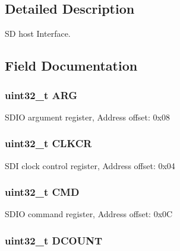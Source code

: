 \subsection{Detailed Description}
S\-D host Interface. 

\subsection{Field Documentation}
\hypertarget{struct_s_d_i_o___type_def_a07d4e63efcbde252c667e64a8d818aa9}{
\subsubsection[{A\-R\-G}]{ uint32\-\_\-t A\-R\-G}}\label{struct_s_d_i_o___type_def_a07d4e63efcbde252c667e64a8d818aa9}
S\-D\-I\-O argument register, Address offset\-: 0x08 \hypertarget{struct_s_d_i_o___type_def_aa94197378e20fc739d269be49d9c5d40}{
\subsubsection[{C\-L\-K\-C\-R}]{ uint32\-\_\-t C\-L\-K\-C\-R}}\label{struct_s_d_i_o___type_def_aa94197378e20fc739d269be49d9c5d40}
S\-D\-I clock control register, Address offset\-: 0x04 \hypertarget{struct_s_d_i_o___type_def_adcf812cbe5147d300507d59d4a55935d}{
\subsubsection[{C\-M\-D}]{ uint32\-\_\-t C\-M\-D}}\label{struct_s_d_i_o___type_def_adcf812cbe5147d300507d59d4a55935d}
S\-D\-I\-O command register, Address offset\-: 0x0\-C \hypertarget{struct_s_d_i_o___type_def_a4273e2b5aeb7bdf1006909b1a2b59bc8}{
\subsubsection[{D\-C\-O\-U\-N\-T}]{ uint32\-\_\-t D\-C\-O\-U\-N\-T}}\label{struct_s_d_i_o___type_def_a4273e2b5aeb7bdf1006909b1a2b59bc8}
